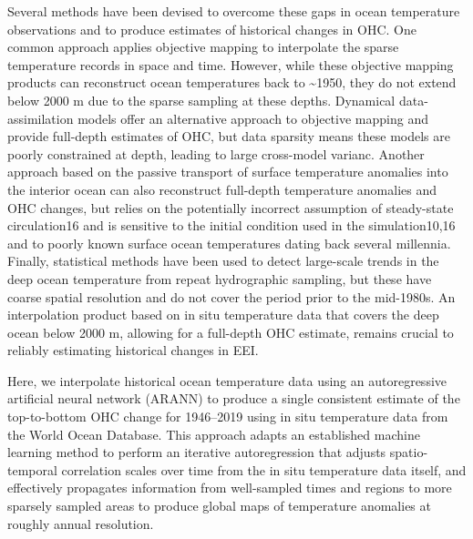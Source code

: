 \documentclass[
]{book}
\begin{document}
Several methods have been devised to overcome these gaps in ocean temperature observations and to produce estimates of historical changes in OHC. One common approach applies objective mapping to interpolate the sparse temperature records in space and time. However, while these objective mapping products can reconstruct ocean temperatures back to \textasciitilde1950, they do not extend below 2000 m due to the sparse sampling at these depths. Dynamical data-assimilation models offer an alternative approach to objective mapping and provide full-depth estimates of OHC, but data sparsity means these models are poorly constrained at depth, leading to large cross-model varianc. Another approach based on the passive transport of surface temperature anomalies into the interior ocean can also reconstruct full-depth temperature anomalies and OHC changes, but relies on the potentially incorrect assumption of steady-state circulation16 and is sensitive to the initial condition used in the simulation10,16 and to poorly known surface ocean temperatures dating back several millennia. Finally, statistical methods have been used to detect large-scale trends in the deep ocean temperature from repeat hydrographic sampling, but these have coarse spatial resolution and do not cover the period prior to the mid-1980s. An interpolation product based on in situ temperature data that covers the deep ocean below 2000 m, allowing for a full-depth OHC estimate, remains crucial to reliably estimating historical changes in EEI.

Here, we interpolate historical ocean temperature data using an autoregressive artificial neural network (ARANN) to produce a single consistent estimate of the top-to-bottom OHC change for 1946--2019 using in situ temperature data from the World Ocean Database.
This approach adapts an established machine learning method to perform an iterative autoregression that adjusts spatio-temporal correlation scales over time from the in situ temperature data itself, and effectively propagates information from well-sampled times and regions to more sparsely sampled areas to produce global maps of temperature anomalies at roughly annual resolution.
\end{document}
